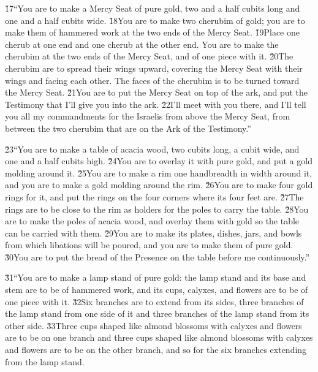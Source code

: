 \v{17}``You are to make a Mercy Seat of pure gold, two and a half cubits long and one and a half cubits wide. \v{18}You are to make two cherubim of gold; you are to make them of hammered work at the two ends of the Mercy Seat. \v{19}Place one cherub at one end and one cherub at the other end. You are to make the cherubim at the two ends of the Mercy Seat, and of one piece with it. \v{20}The cherubim are to spread their wings upward, covering the Mercy Seat with their wings and facing each other. The faces of the cherubim is to be turned toward the Mercy Seat. \v{21}You are to put the Mercy Seat on top of the ark, and put the Testimony that I'll give you into the ark. \v{22}I'll meet with you there, and I'll tell you all my commandments for the Israelis from above the Mercy Seat, from between the two cherubim that are on the Ark of the Testimony.''

\v{23}``You are to make a table of acacia wood, two cubits long, a cubit wide, and one and a half cubits high. \v{24}You are to overlay it with pure gold, and put a gold molding around it. \v{25}You are to make a rim one handbreadth in width around it, and you are to make a gold molding around the rim. \v{26}You are to make four gold rings for it, and put the rings on the four corners where its four feet are. \v{27}The rings are to be close to the rim as holders for the poles to carry the table. \v{28}You are to make the poles of acacia wood, and overlay them with gold so the table can be carried with them. \v{29}You are to make its plates, dishes, jars, and bowls from which libations will be poured, and you are to make them of pure gold. \v{30}You are to put the bread of the Presence on the table before me continuously.''

\v{31}``You are to make a lamp stand of pure gold: the lamp stand and its base and stem are to be of hammered work, and its cups, calyxes, and flowers are to be of one piece with it. \v{32}Six branches are to extend from its sides, three branches of the lamp stand from one side of it and three branches of the lamp stand from its other side. \v{33}Three cups shaped like almond blossoms with calyxes and flowers are to be on one branch and three cups shaped like almond blossoms with calyxes and flowers are to be on the other branch, and so for the six branches extending from the lamp stand.

